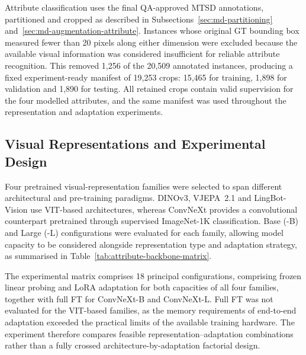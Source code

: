Attribute classification uses the final \gls{QA}-approved \gls{MTSD} annotations, partitioned and cropped as described in Subsections~\ref{sec:md-partitioning} and~\ref{sec:md-augmentation-attribute}. Instances whose original \gls{GT} bounding box measured fewer than 20 pixels along either dimension were excluded because the available visual information was considered insufficient for reliable attribute recognition. This removed 1,256 of the 20,509 annotated instances, producing a fixed experiment-ready manifest of 19,253 crops: 15,465 for training, 1,898 for validation and 1,890 for testing. All retained crops contain valid supervision for the four modelled attributes, and the same manifest was used throughout the representation and adaptation experiments.

\subsection{Visual Representations and Experimental Design}
\label{sec:attribute-backbones}
Four pretrained visual-representation families were selected to span different architectural and pre-training paradigms. \gls{DINO}v3, \gls{VJEPA}~2.1 and LingBot-Vision use \gls{VIT}-based architectures, whereas ConvNeXt provides a convolutional counterpart pretrained through supervised ImageNet-1K classification. Base (-B) and Large (-L) configurations were evaluated for each family, allowing model capacity to be considered alongside representation type and adaptation strategy, as summarised in Table~\ref{tab:attribute-backbone-matrix}.

The experimental matrix comprises 18 principal configurations, comprising frozen linear probing and \gls{LoRA} adaptation for both capacities of all four families, together with full \gls{FT} for ConvNeXt-B and ConvNeXt-L. Full \gls{FT} was not evaluated for the \gls{VIT}-based families, as the memory requirements of end-to-end adaptation exceeded the practical limits of the available training hardware. The experiment therefore compares feasible representation--adaptation combinations rather than a fully crossed architecture-by-adaptation factorial design.

